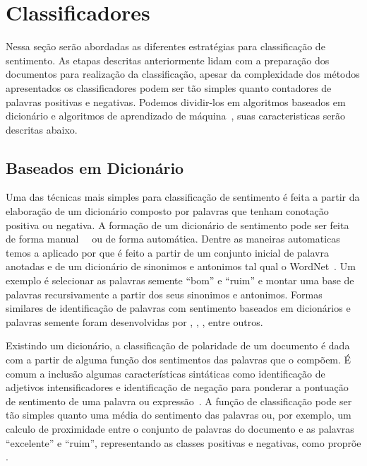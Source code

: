 \section{Classificadores}

Nessa seção serão abordadas as diferentes estratégias para classificação de
sentimento.
As etapas descritas anteriormente lidam com a preparação dos documentos para
realização da classificação, apesar da complexidade dos métodos apresentados os
classificadores podem ser tão simples quanto contadores de palavras positivas e
negativas.
Podemos dividir-los em algoritmos baseados em dicionário e algoritmos de
aprendizado de máquina~\cite{taboada11}, suas caracteristicas serão descritas
abaixo.

\subsection{Baseados em Dicionário} \label{sec:dictionary}

Uma das técnicas mais simples para classificação de sentimento é feita a partir
da elaboração de um dicionário composto por palavras que tenham conotação
positiva ou negativa.
A formação de um dicionário de sentimento pode ser feita de forma
manual~\cite{stone66}~\cite{tong01} ou de forma automática.
Dentre as maneiras automaticas temos a aplicado por \citet{hu04} que é feito a
partir de um conjunto inicial de palavra anotadas e de um dicionário de
sinonimos e antonimos tal qual o WordNet~\cite{miller90}.
Um exemplo é selecionar as palavras semente ``bom'' e ``ruim'' e montar uma base de
palavras recursivamente a partir dos seus sinonimos e antonimos.
Formas similares de identificação de palavras com sentimento baseados em
dicionários e palavras semente foram desenvolvidas por \citet{blair08},
\citet{rao09}, \citet{hassan10}, entre outros.

Existindo um dicionário, a classificação de polaridade de um documento é dada
com a partir de alguma função dos sentimentos das palavras que o compõem.
É comum a inclusão algumas características sintáticas como identificação de
adjetivos intensificadores e identificação de negação para ponderar a pontuação
de sentimento de uma palavra ou expressão~\cite{taboada11}.
A função de classificação pode ser tão simples quanto uma média do sentimento
das palavras ou, por exemplo, um calculo de proximidade entre o conjunto de
palavras do documento e as palavras ``excelente'' e ``ruim'', representando as
classes positivas e negativas, como proprõe \citet{turney02}.

